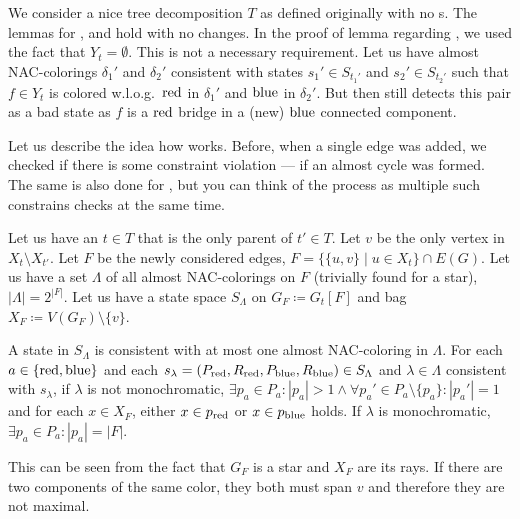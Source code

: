 We consider a nice tree decomposition \( T \) as defined originally
with no \IntroduceEdgeNode{}s.
The lemmas for
\LeafNode{}, \RootNode{} and \ForgetVertexNode{} hold with no changes.
%
In the proof of lemma 
regarding \JoinNode{},
we used the fact that \( Y_t = \emptyset \).
This is not a necessary requirement.
%
Let us have almost NAC-colorings \( \delta_1' \) and \( \delta_2' \)
consistent with states \( s_1' \in S_{t_1'} \) and \( s_2' \in S_{t_2'} \)
such that \( f \in Y_t \) is colored w.l.o.g.\ \( \text{red} \) in \( \delta_1' \)
and \( \text{blue} \) in \( \delta_2' \).
But then 
still detects this pair as a bad state
as \( f \) is a \( \text{red} \) bridge in a (new) \( \text{blue} \) connected component.

Let us describe the idea how \IntroduceVertexWithEdgesNode{} works.
Before, when a single edge was added,
we checked if there is some constraint violation
--- if an almost cycle was formed.
The same is also done for \IntroduceVertexWithEdgesNode{},
but you can think of the process as
multiple such constrains checks at the same time.

Let us have an \IntroduceVertexWithEdgesNode{} \( t \in T \) that
is the only parent of \( t' \in T \).
Let \( v \) be the only vertex in \( X_t \setminus X_{t'} \).
Let \( F \) be the newly considered edges,
\( F = \{ \{ u, v \} \mid u \in X_t \} \cap E(G) \).
%
Let us have a set \( \Lambda \) of all almost NAC-colorings on \( F \)
(trivially found for a star), \( |\Lambda| = 2^{|F|} \).
Let us have a state space \( S_\Lambda \) on \( G_F \coloneqq G_t[F] \)
and bag \( X_F \coloneqq V(G_F) \setminus \{ v \} \).
%
\begin{observation}
	A state in \( S_\Lambda \) is consistent with at most one
	almost NAC-coloring in \( \Lambda \).
	For each \( a \in \{\text{red}, \text{blue}\} \) and
	each \( s_\lambda = (P_{\text{red}}, R_{\text{red}}, P_{\text{blue}}, R_{\text{blue}}) \in S_\Lambda \)
	and \( \lambda \in \Lambda \) consistent with \( s_\lambda \),
	if \( \lambda \) is not monochromatic,
	\( \exists p_a \in P_a : |p_a| > 1
	\land \forall p_a' \in P_a \setminus \{p_a\} : |p_a'| = 1 \)
	and for each \( x \in X_F \), either \( x \in p_{\text{red}} \) or \( x \in p_{\text{blue}} \) holds.
	If \( \lambda \) is monochromatic, \( \exists p_a \in P_a : |p_a| = |F| \).
\end{observation}
%
This can be seen from the fact that \( G_F \) is a star and \( X_F \) are its rays.
If there are two components of the same color,
they both must span \( v \)
and therefore they are not maximal.

